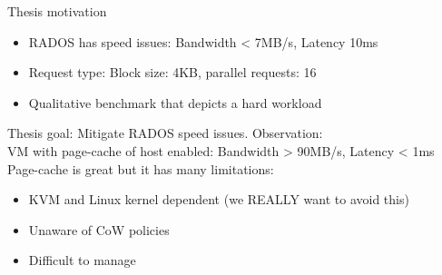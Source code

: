 \begin{frame}{Thesis motivation}
	\begin{itemize}
		\item RADOS has speed issues: Bandwidth < 7MB/s, Latency \mytilde10ms
		\item Request type: Block size: 4KB, parallel requests: 16
		\item Qualitative benchmark that depicts a hard workload
	\end{itemize}
	\spc
	Thesis goal: Mitigate RADOS speed issues.
	\dspc
	Observation:\\
	VM with page-cache of host enabled: Bandwidth > 90MB/s, Latency < 1ms
	\dspc
	Page-cache is great but it has many limitations:
	\begin{itemize}
		\item KVM and Linux kernel dependent (we REALLY want to avoid this)
		\item Unaware of CoW policies
		\item Difficult to manage
	\end{itemize}

\end{frame}

